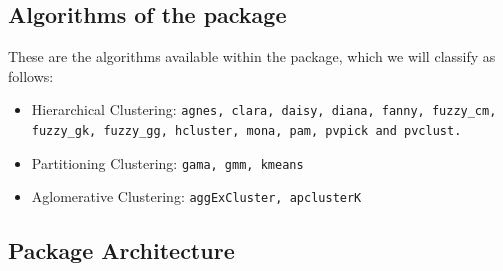 \subsection{Algorithms of the package}
These are the algorithms  available within the package, which we will classify as follows:
\begin{itemize}
  \item Hierarchical Clustering: \texttt{agnes, clara, daisy, diana, fanny, fuzzy\_cm, fuzzy\_gk, fuzzy\_gg, hcluster, mona, pam, pvpick and pvclust.}
  \item Partitioning Clustering: \texttt{gama, gmm, kmeans}
  \item Aglomerative Clustering: \texttt{aggExCluster, apclusterK}
\end{itemize}

\subsection{Package Architecture}

